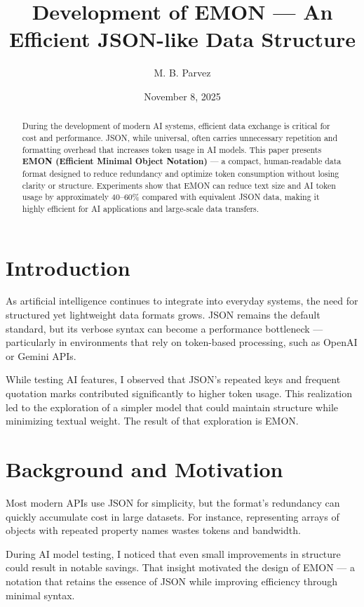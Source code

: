 \documentclass[12pt,a4paper]{article}
\title{Development of EMON --- An Efficient JSON-like Data Structure}
\author{M. B. Parvez}
\date{November 8, 2025}
\begin{document}
\maketitle

\begin{abstract}
During the development of modern AI systems, efficient data exchange is critical for cost and performance. JSON, while universal, often carries unnecessary repetition and formatting overhead that increases token usage in AI models. This paper presents \textbf{EMON (Efficient Minimal Object Notation)} --- a compact, human-readable data format designed to reduce redundancy and optimize token consumption without losing clarity or structure. Experiments show that EMON can reduce text size and AI token usage by approximately 40--60\% compared with equivalent JSON data, making it highly efficient for AI applications and large-scale data transfers.
\end{abstract}

\section{Introduction}
As artificial intelligence continues to integrate into everyday systems, the need for structured yet lightweight data formats grows. JSON remains the default standard, but its verbose syntax can become a performance bottleneck --- particularly in environments that rely on token-based processing, such as OpenAI or Gemini APIs.

While testing AI features, I observed that JSON’s repeated keys and frequent quotation marks contributed significantly to higher token usage. This realization led to the exploration of a simpler model that could maintain structure while minimizing textual weight. The result of that exploration is EMON.

\section{Background and Motivation}
Most modern APIs use JSON for simplicity, but the format’s redundancy can quickly accumulate cost in large datasets. For instance, representing arrays of objects with repeated property names wastes tokens and bandwidth.

During AI model testing, I noticed that even small improvements in structure could result in notable savings. That insight motivated the design of EMON --- a notation that retains the essence of JSON while improving efficiency through minimal syntax.
\end{document}
